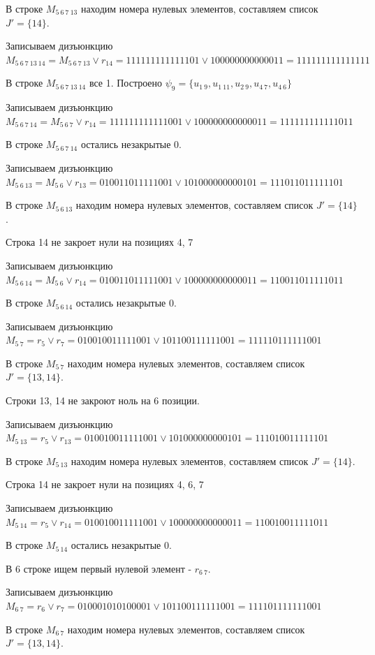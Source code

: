 \documentclass{article}
\begin{document}
В строке $M_{5\ 6\ 7\ 13}$ находим номера нулевых элементов, составляем список $J' = \{14\}$.

Записываем дизъюнкцию $M_{5\ 6\ 7\ 13\ 14} = M_{5\ 6\ 7\ 13}\lor r_{14} = 111111111111101 \lor 100000000000011 = 111111111111111$

В строке $M_{5\ 6\ 7\ 13\ 14}$ все 1. Построено $\psi_{9} = \{u_{1\ 9},u_{1\ 11},u_{2\ 9},u_{4\ 7},u_{4\ 6}\}$

Записываем дизъюнкцию $M_{5\ 6\ 7\ 14} = M_{5\ 6\ 7}\lor r_{14} = 111111111111001 \lor 100000000000011 = 111111111111011$

В строке $M_{5\ 6\ 7\ 14}$ остались незакрытые 0.

Записываем дизъюнкцию $M_{5\ 6\ 13} = M_{5\ 6}\lor r_{13} = 010011011111001 \lor 101000000000101 = 111011011111101$

В строке $M_{5\ 6\ 13}$ находим номера нулевых элементов, составляем список $J' = \{14\}$.

Строка 14 не закроет нули на позициях 4, 7

Записываем дизъюнкцию $M_{5\ 6\ 14} = M_{5\ 6}\lor r_{14} = 010011011111001 \lor 100000000000011 = 110011011111011$

В строке $M_{5\ 6\ 14}$ остались незакрытые 0.

Записываем дизъюнкцию $M_{5\ 7} = r_{5}\lor r_{7} = 010010011111001 \lor 101100111111001 = 111110111111001$

В строке $M_{5\ 7}$ находим номера нулевых элементов, составляем список $J' = \{13, 14\}$.

Строки 13, 14 не закроют ноль на 6 позиции.

Записываем дизъюнкцию $M_{5\ 13} = r_{5}\lor r_{13} = 010010011111001 \lor 101000000000101 = 111010011111101$

В строке $M_{5\ 13}$ находим номера нулевых элементов, составляем список $J' = \{14\}$.

Строка 14 не закроет нули на позициях 4, 6, 7

Записываем дизъюнкцию $M_{5\ 14} = r_{5}\lor r_{14} = 010010011111001 \lor 100000000000011 = 110010011111011$

В строке $M_{5\ 14}$ остались незакрытые 0.



В 6 строке ищем первый нулевой элемент - $r_{6\ 7}$.

Записываем дизъюнкцию $M_{6\ 7} = r_{6}\lor r_{7} = 010001010100001 \lor 101100111111001 = 111101111111001$

В строке $M_{6\ 7}$ находим номера нулевых элементов, составляем список $J' = \{13, 14\}$.
\end{document}
